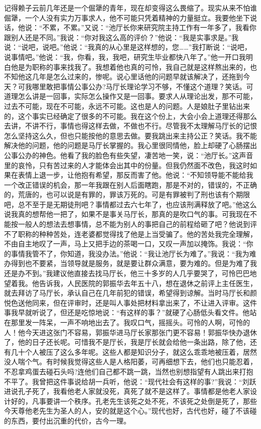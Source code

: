 \documentclass[12pt,oneside]{book}
\begin{document}
记得赖子云前几年还是一个倔犟的青年，现在却变得这么畏缩了。现实从来不怕谁倔犟，一个人没有实力万事求人，他不可能只凭着精神的力量挺立。我要他坐下说话，他说：``不累，不累。''又说：``池厅长你来研究院主持工作有一年多了，我看你跟别人还是不同。''我说：``你对我这么高的评价？''他说：``我是实事求是。''我说：``说吧，说吧。''他说：``我真的从心里是这样想的，您\ldots\ldots{}''我打断说：``说吧，说事情吧。''他说：``我，你看，我，我吧，研究生毕业都快八年了。''他一开口我明白他是为职称的事来找我了。我想着他也真的可怜，我自己就是这样熬出来的，也不知他这几年是怎么过来的，惨呢。说心里话他的问题早就该解决了，还拖到今天？可我哪里敢把事情公事公办?马厅长理论学习不够，不懂这个道理？笑话。可道理怎么讲是一回事，实际怎么操作又是一回事。要求人从理论出发，那不可能，过去不可能，现在不可能，永远不可能。这也是人的问题。人是娘肚子里钻出来的，这个事实已经确定了很多的不可能。我在这个份上，大会小会上道理还得那么去讲，不讲不行，事情也得这样去做，不做也不行。尽管我不太理解马厅长的记恨怎么坚持这么久，但也只能按他的意思去做。要我跳出来主持公正？笑话。我不能解决他的问题，他的问题是马厅长掌握的。我心里很同情他，脸上却硬了心肠摆出公事公办的神色。他看了我的脸色有些失望，凄苦地一笑，说：``池厅长。''这声音里的哀怜，只有苦过来的人才能体会出其中的份量。但我仍然面不改色，我这时如果在表情上退一步，让他抱有希望，那反而害了他。他说：``不知领导能不能给我一个改正错误的机会，那一年我跟在别人后面瞎跑，那是不对的，错误的，不正确的，荒唐的，也可以说是有罪的，罪该万死的。可是有罪被判了刑也该有个期限吧，总不至于是无期徒刑吧？事情都过去六七年了，也应该刑满释放了吧。''他这么说我真的想帮他一把了，如果不是事关马厅长，那真的是吹口气的事。可我现在不能按一般人的想法去想事情，总不能为别人的事把自己的前程给砸了吧？他说到评不了职称的种种苦处，连老婆都觉得找了他是上当受骗了。他的苦处我完全理解，不由自主地叹了一声，马上又把手边的茶喝一口，又叹一声加以掩饰。我说：``你的事情我管不了，你知道，我没办法。''他说：``我让池厅长为难了。''我说：``我为难办得到也不要紧，当领导就是服务，就是要让群众满意，要为难的。但是为难了我还是办不到。''我建议他直接去找马厅长，他三十多岁的人几乎要哭了，可怜巴巴地望着我。他告诉我，人民医院的郭振华去年五十八，想在退休之前评上主任医生，就去拜访了马厅长，承认自己在几年前犯的错误，希望得到谅解。当时马厅长和颜悦色送他同来，但在评审时，还是叫人事处把材料拿出来了，不让进入评审。这件事我早就听说了，但还是吃惊地说：``有这样的事？''就硬了心肠低头看文件。他站在那里发一阵呆，一声不响地出去了。我叹口气，摇摇头。可怜的人啊，可怜的人！他今天进这张门不容易，郭振华进马厅长家那张门更不容易！郭振华快办退休了，他的日子还长呢。可惜我不是厅长，我是厅长就会给他一条出路，除了他，还有几十个人被压了这么多年呢。这些人都是知识分子，就这么乖乖地被压着，居然没人喘个气。有时候我觉得这些人是人格阳萎，可再细想下去，他们也只能忍着，不忍拿鸡蛋去碰石头吗?连他们自己都不跳一跳，当然也别想指望有人跳出来打抱不平了。我曾把这件事说给胡一兵听，他说：``现代社会有这样的事?''我说：``刘跃进说孔子死了，我看他老人家就没死，真死了就不是这样了。事情都是他老人家设计好的，凡事要讲一个秩序。孔老先生该死之处不死，不该死之处倒是死了，那些今天尊他老先生为圣人的人，安的就是这个心。''现代也好，古代也好，碰了不该碰的东西，要付出沉重的代价，古今一理。
\end{document}
